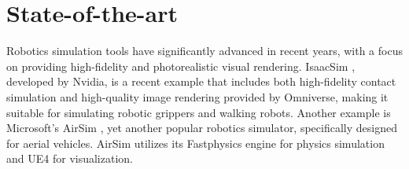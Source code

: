 \section{State-of-the-art} \label{sec:soa}



Robotics simulation tools have significantly advanced in recent years, with a focus on providing  high-fidelity and photorealistic visual rendering. IsaacSim \cite{isaac}, developed by Nvidia, is a recent example that includes both high-fidelity contact simulation and high-quality image rendering provided by Omniverse, making it suitable for simulating robotic grippers and walking robots. Another example is Microsoft's AirSim \cite{airsim}, yet another popular robotics simulator, specifically designed for aerial vehicles. AirSim utilizes its Fastphysics engine for physics simulation and \ac{UE4} for visualization.

